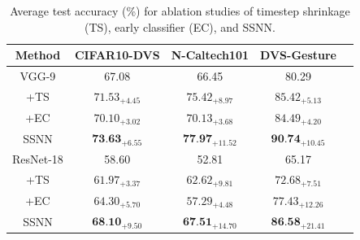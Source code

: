 \documentclass[letterpaper]{article} %
\begin{document}
\begin{table}[t]
\columnwidth
 \centering
 \begin{tabular}{ccccc}
  \toprule
 Method & CIFAR10-DVS & N-Caltech101 & DVS-Gesture\\
  \midrule
  VGG-9 & 67.08 & 66.45 & 80.29\\
  +TS & $71.53_{+4.45}$ & $75.42_{+8.97}$ & $85.42_{+5.13}$\\
  +EC & $70.10_{+3.02}$ & $70.13_{+3.68}$ & $84.49_{+4.20}$\\
  SSNN & $\textbf{73.63}_{+6.55}$ & $\textbf{77.97}_{+11.52}$ & $\textbf{90.74}_{+10.45}$\\
  \hline
  ResNet-18 & 58.60 & 52.81 & 65.17\\
  +TS & $61.97_{+3.37}$ & $62.62_{+9.81}$  & $72.68_{+7.51}$\\
  +EC & $64.30_{+5.70}$ & $57.29_{+4.48}$ & $77.43_{+12.26}$\\
  SSNN & $\textbf{68.10}_{+9.50}$ & $\textbf{67.51}_{+14.70}$ & $\textbf{86.58}_{+21.41}$\\
  \bottomrule
 \end{tabular}
 \caption{Average test accuracy (\%) for ablation studies of timestep shrinkage (TS), early classifier (EC), and SSNN.}
 \label{ablation}
\end{table}
\end{document}
